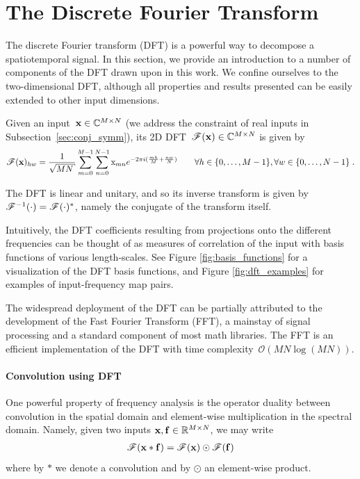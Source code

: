 \documentclass{article} %
\begin{document}
\section{The Discrete Fourier Transform}
\label{sec:dft}
The discrete Fourier transform (DFT) is a powerful way to decompose a spatiotemporal signal. In this section, we provide an introduction to a number of components of the DFT drawn upon in this work. We confine ourselves to the two-dimensional DFT, although all properties and results presented can be easily extended to other input dimensions. 

Given an input~${\boldsymbol{\mathrm{x}} \in \mathbb{C}^{M\times N}}$ (we address the constraint of real inputs in Subsection~\ref{sec:conj_symm}), its 2D DFT~${\mathscr{F}(\boldsymbol{\mathrm{x}})\in\mathbb{C}^{M\times N}}$ is given by
\begin{align}
\fourier(\rmbx)_{hw} = \frac{1}{\sqrt{MN}}\sum_{m=0}^{M-1} \sum_{n=0}^{N-1} \rmx_{mn} e^{-2\pi i(\frac{mh}{M} + \frac{nw}{N})}\qquad\forall h\in\{0,\ldots, M-1\}, \forall w\in\{0,\ldots, N-1\}\;\notag.
\end{align}

The DFT is linear and unitary, and so its inverse transform is given by~${\mathscr{F}^{-1}(\cdot)=\mathscr{F}(\cdot)^*}$, namely the conjugate of the transform itself. 

Intuitively, the DFT coefficients resulting from projections onto the different frequencies can be thought of as measures of correlation of the input with basis functions of various length-scales. See Figure \ref{fig:basis_functions} for a visualization of the DFT basis functions, and Figure \ref{fig:dft_examples} for examples of input-frequency map pairs. 

The widespread deployment of the DFT can be partially attributed to the development of the Fast Fourier Transform (FFT), a mainstay of signal processing and a standard component of most math libraries. The FFT is an efficient implementation of the DFT with time complexity~$\mathcal{O}\left(MN\log{(MN)}\right)$.

\paragraph{Convolution using DFT} One powerful property of frequency analysis is the operator duality between convolution in the spatial domain and element-wise multiplication in the spectral domain.  Namely, given two inputs ${\boldsymbol{\mathrm{x}},\boldsymbol{\mathrm{f}}\in\mathbb{R}^{M\times N}}$, we may write
\begin{align}
\mathscr{F}(\boldsymbol{\mathrm{x}}*\boldsymbol{\mathrm{f}}) = \mathscr{F}(\boldsymbol{\mathrm{x}})\odot\mathscr{F}(\boldsymbol{\mathrm{f}})
\end{align}
where by $*$ we denote a convolution and by $\odot$ an element-wise product.
\end{document}
